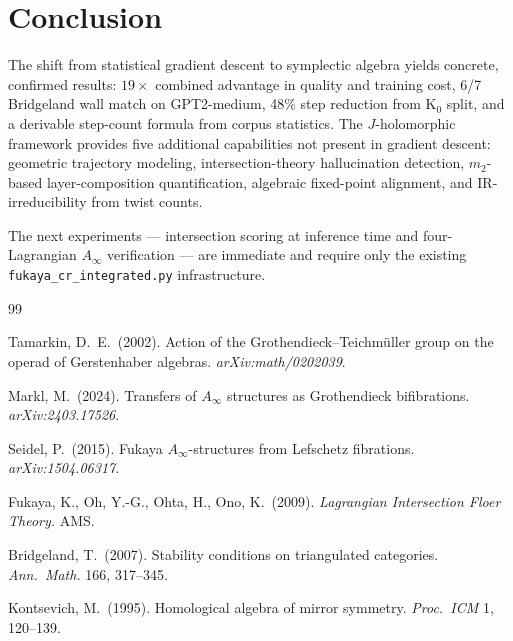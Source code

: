 \documentclass[11pt]{amsart}
\begin{document}
\section{Conclusion}
\label{sec:conclusion}

The shift from statistical gradient descent to symplectic algebra
yields concrete, confirmed results:
$19\times$ combined advantage in quality and training cost,
6/7 Bridgeland wall match on GPT2-medium,
48\% step reduction from K$_0$ split,
and a derivable step-count formula from corpus statistics.
The $J$-holomorphic framework provides five additional capabilities
not present in gradient descent: geometric trajectory modeling,
intersection-theory hallucination detection, $m_2$-based layer-composition
quantification, algebraic fixed-point alignment, and IR-irreducibility
from twist counts.

The next experiments --- intersection scoring at inference time
and four-Lagrangian $A_\infty$ verification --- are immediate
and require only the existing \texttt{fukaya\_cr\_integrated.py}
infrastructure.

\begin{thebibliography}{99}

Tamarkin, D.~E.\ (2002).
Action of the Grothendieck--Teichm{\"u}ller group on the operad of
Gerstenhaber algebras.
\emph{arXiv:math/0202039}.

Markl, M.\ (2024).
Transfers of $A_\infty$ structures as Grothendieck bifibrations.
\emph{arXiv:2403.17526}.

Seidel, P.\ (2015).
Fukaya $A_\infty$-structures from Lefschetz fibrations.
\emph{arXiv:1504.06317}.

Fukaya, K., Oh, Y.-G., Ohta, H., Ono, K.\ (2009).
\emph{Lagrangian Intersection Floer Theory.}
AMS.

Bridgeland, T.\ (2007).
Stability conditions on triangulated categories.
\emph{Ann.\ Math.} 166, 317--345.

Kontsevich, M.\ (1995).
Homological algebra of mirror symmetry.
\emph{Proc.\ ICM} 1, 120--139.

\end{thebibliography}
\end{document}
